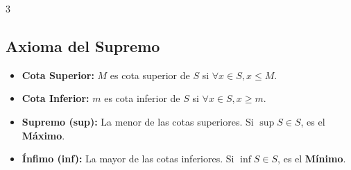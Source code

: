 \documentclass[8pt,letterpaper]{article}
\begin{document}
\begin{multicols*}{3}
\subsection*{Axioma del Supremo}
\begin{itemize}
    \item \textbf{Cota Superior:} $M$ es cota superior de $S$ si $\forall x \in S, x \le M$.
    \item \textbf{Cota Inferior:} $m$ es cota inferior de $S$ si $\forall x \in S, x \ge m$.
    \item \textbf{Supremo (sup):} La menor de las cotas superiores. Si $\sup S \in S$, es el \textbf{Máximo}.
    \item \textbf{Ínfimo (inf):} La mayor de las cotas inferiores. Si $\inf S \in S$, es el \textbf{Mínimo}.
\end{itemize}

\end{multicols*}
\newpage
\end{document}
